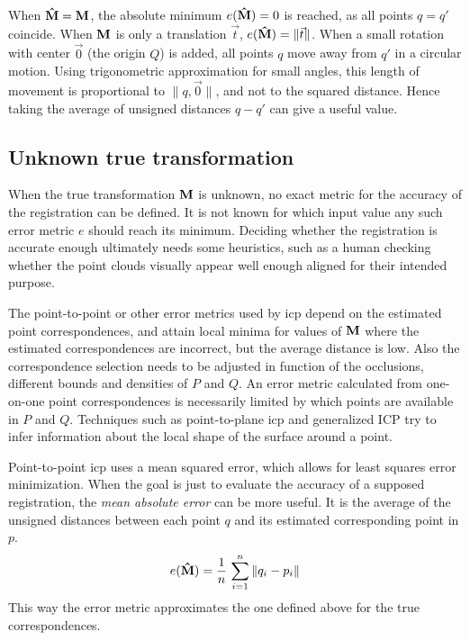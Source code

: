 When $\mathbf{\hat{M}} = \mathbf{M}$, the absolute minimum $e(\mathbf{\hat{M}}) = 0$ is reached, as all points $q = q'$ coincide. When $\mathbf{M}$ is only a translation $\vec{t}$, $e(\mathbf{\hat{M}}) = \| \vec{t} \|$. When a small rotation with center $\vec{0}$ (the origin $Q$) is added, all points $q$ move away from $q'$ in a circular motion. Using trigonometric approximation for small angles, this length of movement is proportional to $\| q, \vec{0}\|$, and not to the squared distance. Hence taking the average of unsigned distances $q - q'$ can give a useful value.

\subsection{Unknown true transformation}
When the true transformation $\mathbf{M}$ is unknown, no exact metric for the accuracy of the registration can be defined. It is not known for which input value any such error metric $e$ should reach its minimum. Deciding whether the registration is accurate enough ultimately needs some heuristics, such as a human checking whether the point clouds visually appear well enough aligned for their intended purpose.

The point-to-point or other error metrics used by \gls{icp} depend on the estimated point correspondences, and attain local minima for values of $\mathbf{M}$ where the estimated correspondences are incorrect, but the average distance is low. Also the correspondence selection needs to be adjusted in function of the occlusions, different bounds and densities of $P$ and $Q$. An error metric calculated from one-on-one point correspondences is necessarily limited by which points are available in $P$ and $Q$. Techniques such as point-to-plane \gls{icp} and generalized ICP try to infer information about the local shape of the surface around a point.

Point-to-point \gls{icp} uses a mean squared error, which allows for least squares error minimization. When the goal is just to evaluate the accuracy of a supposed registration, the \emph{mean absolute error} can be more useful. It is the average of the unsigned distances between each point $q$ and its estimated corresponding point in $p$.
\begin{equation}
e(\mathbf{\hat{M}}) = \frac{1}{n} \, \sum_{i=1}^{n} \| q_i - p_i \|
\end{equation}
This way the error metric approximates the one defined above for the true correspondences.


